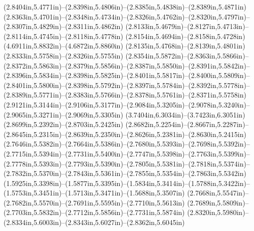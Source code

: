 (2.8404in,5.4771in)--(2.8398in,5.4806in)--(2.8385in,5.4838in)--(2.8389in,5.4871in) (2.8363in,5.4701in)--(2.8348in,5.4734in)--(2.8326in,5.4762in)--(2.8320in,5.4797in)--(2.8307in,5.4829in)--(2.8311in,5.4862in) (2.8133in,5.4679in)--(2.8127in,5.4713in)--(2.8114in,5.4745in)--(2.8118in,5.4778in) (2.8154in,5.4694in)--(2.8158in,5.4728in) (4.6911in,5.8832in)--(4.6872in,5.8860in) (2.8135in,5.4768in)--(2.8139in,5.4801in) (2.8333in,5.5758in)--(2.8326in,5.5755in) (2.8354in,5.5872in)--(2.8363in,5.5866in)--(2.8372in,5.5863in)--(2.8379in,5.5856in)--(2.8387in,5.5850in)--(2.8391in,5.5842in)--(2.8396in,5.5834in)--(2.8398in,5.5825in)--(2.8401in,5.5817in)--(2.8400in,5.5809in)--(2.8401in,5.5800in)--(2.8398in,5.5792in)--(2.8397in,5.5784in)--(2.8392in,5.5778in)--(2.8389in,5.5771in)--(2.8383in,5.5766in)--(2.8378in,5.5761in)--(2.8371in,5.5758in) (2.9121in,5.3144in)--(2.9106in,5.3177in)--(2.9084in,5.3205in)--(2.9078in,5.3240in)--(2.9065in,5.3271in)--(2.9069in,5.3305in) (3.7404in,6.3034in)--(3.7423in,6.3051in) (2.8699in,5.2392in)--(2.8703in,5.2425in) (2.8682in,5.2254in)--(2.8667in,5.2287in)--(2.8645in,5.2315in)--(2.8639in,5.2350in)--(2.8626in,5.2381in)--(2.8630in,5.2415in) (2.7646in,5.5382in)--(2.7664in,5.5386in)--(2.7680in,5.5393in)--(2.7698in,5.5392in)--(2.7715in,5.5394in)--(2.7731in,5.5400in)--(2.7747in,5.5398in)--(2.7763in,5.5399in)--(2.7778in,5.5393in)--(2.7793in,5.5390in)--(2.7805in,5.5381in)--(2.7818in,5.5374in)--(2.7832in,5.5370in)--(2.7843in,5.5361in)--(2.7855in,5.5354in)--(2.7863in,5.5342in) (1.5925in,5.3398in)--(1.5877in,5.3395in)--(1.5834in,5.3414in)--(1.5788in,5.3422in)--(1.5753in,5.3451in)--(1.5713in,5.3471in)--(1.5688in,5.3507in) (2.7668in,5.5547in)--(2.7682in,5.5570in)--(2.7691in,5.5595in)--(2.7710in,5.5613in) (2.7689in,5.5809in)--(2.7703in,5.5832in)--(2.7712in,5.5856in)--(2.7731in,5.5874in) (2.8320in,5.5980in)--(2.8334in,5.6003in)--(2.8343in,5.6027in)--(2.8362in,5.6045in)
